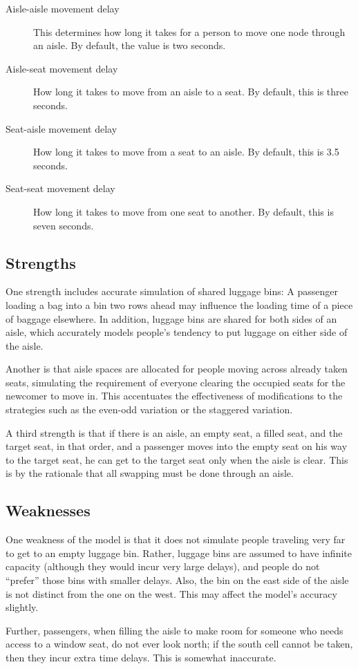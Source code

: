 \documentclass{article}
\begin{document}
\begin{description}
	\item[Aisle-aisle movement delay]
		This determines how long it takes for a person to move one node through
		an aisle. By default, the value is two seconds.

	\item[Aisle-seat movement delay]
		How long it takes to move from an aisle to a seat. By default, this is
		three seconds.

	\item[Seat-aisle movement delay]
		How long it takes to move from a seat to an aisle. By default, this is
		3.5 seconds.

	\item[Seat-seat movement delay]
		How long it takes to move from one seat to another. By default, this is
		seven seconds.

\end{description}

\subsection{Strengths}

One strength includes accurate simulation of shared luggage bins: A passenger
loading a bag into a bin two rows ahead may influence the loading time of a
piece of baggage elsewhere. In addition, luggage bins are shared for both sides
of an aisle, which accurately models people's tendency to put luggage on either
side of the aisle.

Another is that aisle spaces are allocated for people moving across already
taken seats, simulating the requirement of everyone clearing the occupied seats
for the newcomer to move in. This accentuates the effectiveness of modifications
to the strategies such as the even-odd variation or the staggered variation.

A third strength is that if there is an aisle, an empty seat, a filled seat, and
the target seat, in that order, and a passenger moves into the empty seat on his
way to the target seat, he can get to the target seat only when the aisle is
clear. This is by the rationale that all swapping must be done through an aisle.

\subsection{Weaknesses}

One weakness of the model is that it does not simulate people traveling very far
to get to an empty luggage bin. Rather, luggage bins are assumed to have
infinite capacity (although they would incur very large delays), and people do
not ``prefer'' those bins with smaller delays. Also, the bin on the east side of
the aisle is not distinct from the one on the west. This may affect the model's
accuracy slightly.

Further, passengers, when filling the aisle to make room for someone who needs
access to a window seat, do not ever look north; if the south cell cannot be
taken, then they incur extra time delays. This is somewhat inaccurate.
\end{document}
